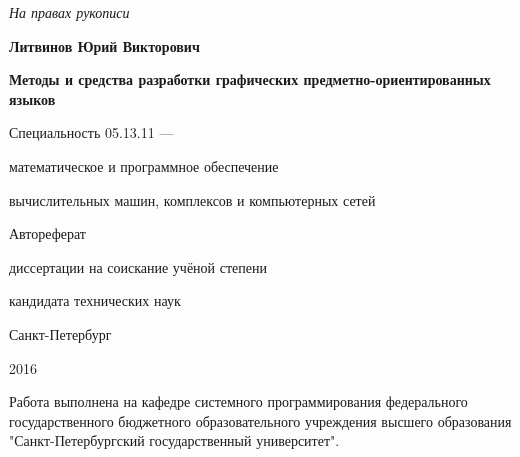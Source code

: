 \newcommand{\sfs}{\fontsize{10pt}{10pt}\selectfont}
\sfs %
\thispagestyle{empty}

\vspace{10mm}
\begin{flushright}
  \Large\textit{На правах рукописи}
\end{flushright}

\vspace{25mm}
\begin{center}
  \Large\bf{Литвинов Юрий Викторович}
\end{center}

\vspace{20mm}
\begin{center}
  {\bf \LARGE Методы и средства разработки графических предметно-ориентированных языков
\par}

\vspace{20mm}
{\Large
Специальность 05.13.11 ---\par
математическое и программное обеспечение\par
вычислительных машин, комплексов и компьютерных сетей
}

\vspace{15mm}
\LARGE Автореферат\par
\Large{диссертации на соискание учёной степени\par
кандидата технических наук}
\end{center}

\vspace{35mm}
\begin{center}
  \Large{Санкт-Петербург\par 2016}
\end{center}

\newpage
\thispagestyle{empty}

\small{
Работа выполнена на кафедре системного программирования федерального государственного
бюджетного образовательного учреждения высшего образования "Санкт-Петербургский
государственный университет".
}

